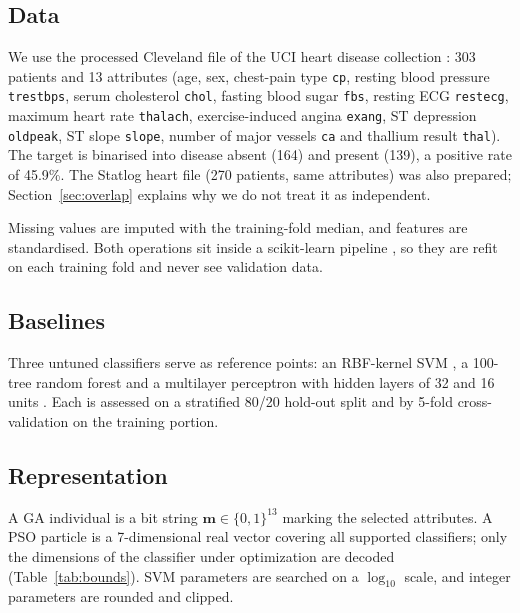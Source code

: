 \documentclass[conference]{IEEEtran}
\begin{document}
\subsection{Data}
We use the processed Cleveland file of the UCI heart disease collection \cite{uci_heart,detrano1989}: 303 patients and 13 attributes (age, sex, chest-pain type \texttt{cp}, resting blood pressure \texttt{trestbps}, serum cholesterol \texttt{chol}, fasting blood sugar \texttt{fbs}, resting ECG \texttt{restecg}, maximum heart rate \texttt{thalach}, exercise-induced angina \texttt{exang}, ST depression \texttt{oldpeak}, ST slope \texttt{slope}, number of major vessels \texttt{ca} and thallium result \texttt{thal}). The target is binarised into disease absent (164) and present (139), a positive rate of 45.9\%. The Statlog heart file \cite{uci_statlog} (270 patients, same attributes) was also prepared; Section~\ref{sec:overlap} explains why we do not treat it as independent.

Missing values are imputed with the training-fold median, and features are standardised. Both operations sit inside a scikit-learn pipeline \cite{pedregosa2011sklearn}, so they are refit on each training fold and never see validation data.

\subsection{Baselines}
Three untuned classifiers serve as reference points: an RBF-kernel SVM \cite{cortes1995svm}, a 100-tree random forest \cite{breiman2001rf} and a multilayer perceptron with hidden layers of 32 and 16 units \cite{rumelhart1986backprop}. Each is assessed on a stratified 80/20 hold-out split and by 5-fold cross-validation on the training portion.

\subsection{Representation}
A GA individual is a bit string $\mathbf{m}\in\{0,1\}^{13}$ marking the selected attributes. A PSO particle is a 7-dimensional real vector covering all supported classifiers; only the dimensions of the classifier under optimization are decoded (Table~\ref{tab:bounds}). SVM parameters are searched on a $\log_{10}$ scale, and integer parameters are rounded and clipped.
\end{document}
